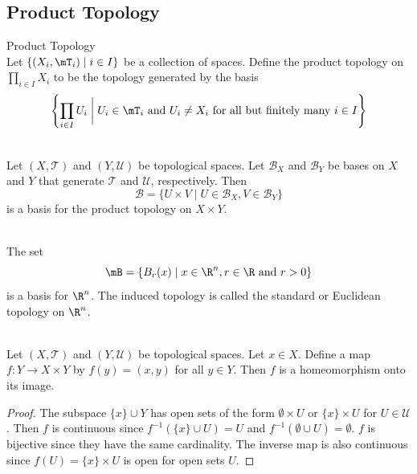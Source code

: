 \documentclass[a4paper]{article}
\begin{document}
\subsection{Product Topology}
\begin{defn}{Product Topology}{}\\
Let $\{(X_i,\mT_i)\;|\;i\in I\}$ be a collection of spaces. Define the product topology on $\prod_{i\in I}X_i$ to be the topology generated by the basis $$\left\{\prod_{i\in I}U_i\;\bigg{|}\;U_i\in\mT_i\text{ and }U_i\neq X_i\text{ for all but finitely many }i\in I\right\}$$
\end{defn}

\begin{prp}{}{}\\
Let $(X,\mathcal{T})$ and $(Y,\mathcal{U})$ be topological spaces. Let $\mathcal{B}_X$ and $\mathcal{B}_Y$ be bases on $X$ and $Y$ that generate $\mathcal{T}$ and $\mathcal{U}$, respectively. Then $$\mathcal{B}=\{U\times V\;|\;U\in\mathcal{B}_X, V\in\mathcal{B}_Y\}$$ is a basis for the product topology on $X\times Y$. 
\end{prp}

\begin{eg}{}{}\\
The set $$\mB=\{B_r(x)\;|\;x\in\R^n,r\in\R\text{ and }r>0\}$$ is a basis for $\R^n$. The induced topology is called the standard or Euclidean topology on $\R^n$. 
\end{eg}

\begin{prp}{}{}\\
Let $(X,\mathcal{T})$ and $(Y,\mathcal{U})$ be topological spaces. Let $x\in X$. Define a map $f:Y\to X\times Y$ by $f(y)=(x,y)$ for all $y\in Y$. Then $f$ is a homeomorphism onto its image. 
\begin{proof}
The subspace $\{x\}\cup Y$ has open sets of the form $\emptyset\times U$ or $\{x\}\times U$ for $U\in\mathcal{U}$. Then $f$ is continuous since $f^{-1}(\{x\}\cup U)=U$ and $f^{-1}(\emptyset\cup U)=\emptyset$. $f$ is bijective since they have the same cardinality. The inverse map is also continuous since $f(U)=\{x\}\times U$ is open for open sets $U$. 
\end{proof}
\end{prp}
\end{document}
